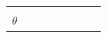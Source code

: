\begin{center}
\begin{xtabular*}{\mytablewidth}[t]{|p{10\mystarwidth}|p{10\mystarwidth}|p{10\mystarwidth}|p{10\mystarwidth}|p{10\mystarwidth}|p{10\mystarwidth}|p{10\mystarwidth}|p{10\mystarwidth}|}
         &
    
    
         &
    
    
         &
    
    
         &
    
    
         &
    
    
         &
    
    
     \tabularnewline{}
    
    
        
                  \begin{math}\theta \end{math}
                 &
    
    

\end{xtabular*}
\end{center}

